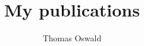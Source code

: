 \documentclass[a4paper,10pt]{article}
\title{My publications}
\author{Thomas Oswald}
\begin{document}
\maketitle

\begin{abstract}

\end{abstract}
\section{}
\cite{ossi09}\\
\cite{pre6}\\
\cite{ruckerundi05}\\
\cite{antenna_report_1}\\
\cite{antenna_report_2}\\
\cite{DF}\\
\cite{direction_finding}\\
\cite{my_masterthesis}\\
\cite{stereo_rheo}\\
\cite{solarorbiter1}\\
\cite{solarorbiter2}\\
\cite{stereo_final}\\
\cite{bale07}\\
\cite{macher07}\\
\cite{oswald10}\\
\cite{macher10}\\
\cite{pre7}\\
\cite{resi09}\\
\cite{sampl10}




\end{document}
